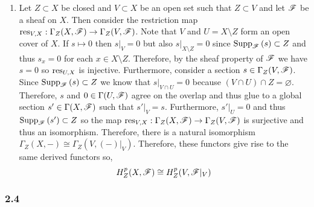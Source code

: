 \documentclass[12pt]{article}
\begin{document}
\begin{enumerate}
\item Let $Z \subset X$ be closed and $V \subset X$ be an open set such that $Z \subset V$ and let $\mathscr{F}$ be a sheaf on $X$. Then consider the restriction map $\mathrm{res}_{V, X} : \Gamma_Z(X, \mathscr{F}) \to \Gamma_Z(V, \mathscr{F})$. Note that $V$ and $U = X \setminus Z$ form an open cover of $X$. If $s \mapsto 0$ then $s|_V = 0$ but also $s|_{X \setminus Z} = 0$ since $\mathrm{Supp}_{\mathscr{F}}\left(s \right) \subset Z$ and thus $s_x = 0$ for each $x \in X \setminus Z$. Therefore, by the sheaf property of $\mathscr{F}$ we have $s = 0$ so $\mathrm{res}_{U,X}$ is injective. Furthermore, consider a section $s \in \Gamma_Z(V, \mathscr{F})$. Since $\mathrm{Supp}_{\mathscr{F}}\left(s \right) \subset Z$ we know that $s |_{V \cap U} = 0$ because $(V \cap U) \cap Z = \varnothing$. Therefore, $s$ and $0 \in \Gamma(U, \mathscr{F})$ agree on the overlap and thus glue to a global section $s' \in \Gamma(X, \mathscr{F})$ such that $s'|_V = s$. Furthermore, $s' |_U = 0$ and thus $\mathrm{Supp}_{\mathscr{F}}\left(s' \right) \subset Z$ so the map $\mathrm{res}_{V, X} : \Gamma_Z(X, \mathscr{F}) \to \Gamma_Z(V, \mathscr{F})$ is surjective and thus an isomorphism. Therefore, there is a natural isomorphism $\Gamma_Z(X, -) \cong \Gamma_Z(V, (-)|_V)$. Therefore, these functors give rise to the same derived functors so,
\[ H^p_Z(X, \mathscr{F}) \cong H^p_Z(V, \mathscr{F}|_V) \] 

\end{enumerate}

\subsubsection{2.4}
\end{document}
